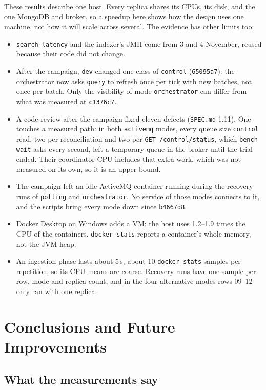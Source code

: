 \documentclass[11pt,a4paper]{article}
\newcommand{\code}[1]{\nolinkurl{#1}}
\newcommand{\mode}[1]{\code{#1}}
\begin{document}
These results describe one host. Every replica shares its CPUs, its disk, and the one MongoDB and broker, so a speedup
here shows how the design uses one machine, not how it will scale across several. The evidence has other limits too:
\begin{itemize}
\item \code{search-latency} and the indexer's JMH come from 3 and 4 November, reused because their code did not change.
\item After the campaign, \code{dev} changed one class of \code{control} (\code{65095a7}): the orchestrator now asks
  \code{query} to refresh once per tick with new batches, not once per batch. Only the visibility of mode
  \mode{orchestrator} can differ from what was measured at \code{c1376c7}.
\item A code review after the campaign fixed eleven defects (\code{SPEC.md} 1.11). One touches a measured path: in both
  \mode{activemq} modes, every queue size \code{control} read, two per reconciliation and two per
  \code{GET /control/status}, which \code{bench wait} asks every second, left a temporary queue in the broker until the
  trial ended. Their coordinator CPU includes that extra work, which was not measured on its own, so it is an upper
  bound.
\item The campaign left an idle ActiveMQ container running during the recovery runs of \mode{polling} and
  \mode{orchestrator}. No service of those modes connects to it, and the scripts bring every mode down since
  \code{b4667d8}.
\item Docker Desktop on Windows adds a VM: the host uses 1.2--1.9 times the CPU of the containers. \code{docker stats}
  reports a container's whole memory, not the JVM heap.
\item An ingestion phase lasts about 5\,s, about 10 \code{docker stats} samples per repetition, so its CPU means are
  coarse. Recovery runs have one sample per row, mode and replica count, and in the four alternative modes rows 09--12
  only ran with one replica.
\end{itemize}
\section{Conclusions and Future Improvements}
\label{sec:conclusions}

\subsection{What the measurements say}
\end{document}
